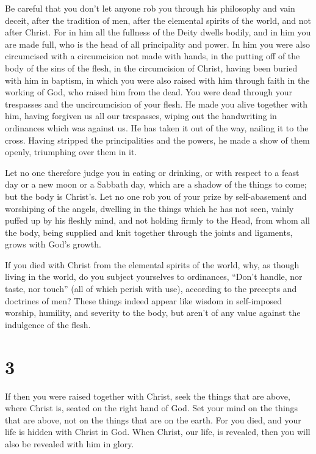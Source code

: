  Be careful that you don't let anyone rob you through his
philosophy and vain deceit, after the tradition of men, after the
elemental spirits of the world, and not after Christ.  For
in him all the fullness of the Deity dwells bodily,  and
in him you are made full, who is the head of all principality and power.
 In him you were also circumcised with a circumcision not
made with hands, in the putting off of the body of the sins of the
flesh, in the circumcision of Christ,  having been buried
with him in baptism, in which you were also raised with him through
faith in the working of God, who raised him from the dead.
 You were dead through your trespasses and the
uncircumcision of your flesh. He made you alive together with him,
having forgiven us all our trespasses,  wiping out the
handwriting in ordinances which was against us. He has taken it out of
the way, nailing it to the cross.  Having stripped the
principalities and the powers, he made a show of them openly, triumphing
over them in it.

 Let no one therefore judge you in eating or drinking, or
with respect to a feast day or a new moon or a Sabbath day,
 which are a shadow of the things to come; but the body
is Christ's.  Let no one rob you of your prize by
self-abasement and worshiping of the angels, dwelling in the things
which he has not seen, vainly puffed up by his fleshly mind,
 and not holding firmly to the Head, from whom all the
body, being supplied and knit together through the joints and ligaments,
grows with God's growth.

 If you died with Christ from the elemental spirits of
the world, why, as though living in the world, do you subject yourselves
to ordinances,  ``Don't handle, nor taste, nor touch''
 (all of which perish with use), according to the
precepts and doctrines of men?  These things indeed
appear like wisdom in self-imposed worship, humility, and severity to
the body, but aren't of any value against the indulgence of the flesh.

\hypertarget{section-2}{%
\section{3}\label{section-2}}

 If then you were raised together with Christ, seek the
things that are above, where Christ is, seated on the right hand of God.
 Set your mind on the things that are above, not on the
things that are on the earth.  For you died, and your life
is hidden with Christ in God.  When Christ, our life, is
revealed, then you will also be revealed with him in glory.

